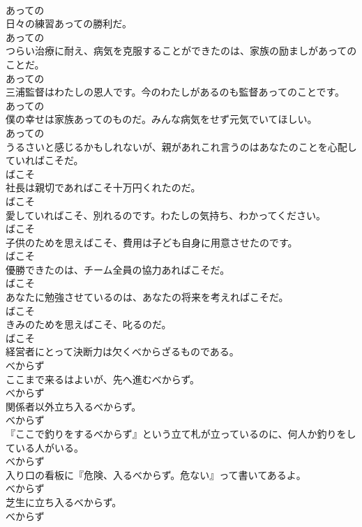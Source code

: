 \documentclass[8pt]{extreport}
\begin{document}
\begin{CJK}{UTF8}{min}
\\	あっての
\\	日々の練習あっての勝利だ。	
\\	あっての
\\	つらい治療に耐え、病気を克服することができたのは、家族の励ましがあってのことだ。	
\\	あっての
\\	三浦監督はわたしの恩人です。今のわたしがあるのも監督あってのことです。	
\\	あっての
\\	僕の幸せは家族あってのものだ。みんな病気をせず元気でいてほしい。	
\\	あっての
\\	うるさいと感じるかもしれないが、親があれこれ言うのはあなたのことを心配していればこそだ。	
\\	ばこそ
\\	社長は親切であればこそ十万円くれたのだ。	
\\	ばこそ
\\	愛していればこそ、別れるのです。わたしの気持ち、わかってください。	
\\	ばこそ
\\	子供のためを思えばこそ、費用は子ども自身に用意させたのです。	
\\	ばこそ
\\	優勝できたのは、チーム全員の協力あればこそだ。	
\\	ばこそ
\\	あなたに勉強させているのは、あなたの将来を考えればこそだ。	
\\	ばこそ
\\	きみのためを思えばこそ、叱るのだ。	
\\	ばこそ
\\	経営者にとって決断力は欠くべからざるものである。	
\\	べからず
\\	ここまで来るはよいが、先へ進むべからず。	
\\	べからず
\\	関係者以外立ち入るべからず。	
\\	べからず
\\	『ここで釣りをするべからず』という立て札が立っているのに、何人か釣りをしている人がいる。	
\\	べからず
\\	入り口の看板に『危険、入るべからず。危ない』って書いてあるよ。	
\\	べからず
\\	芝生に立ち入るべからず。	
\\	べからず

\end{CJK}
\end{document}
